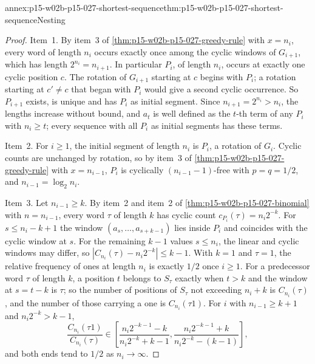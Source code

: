 \begin{annexitem}{annex:p15-w02b-p15-027-shortest-sequence}{thm:p15-w02b-p15-027-shortest-sequence}{Nesting}
\begin{proof}
Item~1. By item~3 of \cref{thm:p15-w02b-p15-027-greedy-rule} with
\(x=n_i\), every word of length \(n_i\) occurs exactly once among the
cyclic windows of \(G_{i+1}\), which has length \(2^{n_i}=n_{i+1}\). In
particular \(P_i\), of length \(n_i\), occurs at exactly one cyclic
position \(c\). The rotation of \(G_{i+1}\) starting at \(c\) begins with
\(P_i\); a rotation starting at \(c'\neq c\) that began with \(P_i\)
would give a second cyclic occurrence. So \(P_{i+1}\) exists, is unique
and has \(P_i\) as initial segment. Since \(n_{i+1}=2^{n_i}>n_i\), the
lengths increase without bound, and \(a_t\) is well defined as the
\(t\)-th term of any \(P_i\) with \(n_i\geq t\); every sequence with all
\(P_i\) as initial segments has these terms.

Item~2. For \(i\geq1\), the initial segment of length \(n_i\) is
\(P_i\), a rotation of \(G_i\). Cyclic counts are unchanged by rotation,
so by item~3 of \cref{thm:p15-w02b-p15-027-greedy-rule} with
\(x=n_{i-1}\), \(P_i\) is cyclically \((n_{i-1}-1)\)-free with
\(p=q=1/2\), and \(n_{i-1}=\log_2n_i\).

Item~3. Let \(n_{i-1}\geq k\). By item~2 and item~2 of
\cref{thm:p15-w02b-p15-027-binomial} with \(n=n_{i-1}\), every word
\(\tau\) of length \(k\) has cyclic count \(c_{P_i}(\tau)=n_i2^{-k}\).
For \(s\leq n_i-k+1\) the window \((a_s,\ldots,a_{s+k-1})\) lies inside
\(P_i\) and coincides with the cyclic window at \(s\). For the remaining
\(k-1\) values \(s\leq n_i\), the linear and cyclic windows may differ,
so \(|C_{n_i}(\tau)-n_i2^{-k}|\leq k-1\).
With \(k=1\) and \(\tau=1\), the relative frequency of ones at length
\(n_i\) is exactly \(1/2\) once \(i\geq1\). For a predecessor word
\(\tau\) of length \(k\), a position \(t\) belongs to \(S_\tau\) exactly
when \(t>k\) and the window at \(s=t-k\) is \(\tau\); so the number of
positions of \(S_\tau\) not exceeding \(n_i+k\) is \(C_{n_i}(\tau)\), and
the number of those carrying a one is \(C_{n_i}(\tau1)\). For \(i\) with
\(n_{i-1}\geq k+1\) and \(n_i2^{-k}>k-1\),
\[
 \frac{C_{n_i}(\tau1)}{C_{n_i}(\tau)}
 \in\left[\frac{n_i2^{-k-1}-k}{n_i2^{-k}+k-1},
 \frac{n_i2^{-k-1}+k}{n_i2^{-k}-(k-1)}\right],
\]
and both ends tend to \(1/2\) as \(n_i\to\infty\).
\end{proof}
\end{annexitem}

